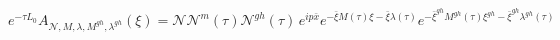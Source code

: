\begin{equation}
e^{-\tau L_{0}}A_{\mathcal{N},M,\lambda ,M^{gh},\lambda ^{gh}}(\xi )=%
\mathcal{N}\mathcal{N}^{m}(\tau )\mathcal{N}^{gh}(\tau )\,e^{ip\bar{x}}e^{-%
\bar{\xi}M(\tau )\xi -\bar{\xi}\lambda (\tau )}e^{-\bar{\xi}^{gh}M^{gh}(\tau
)\xi ^{gh}-\bar{\xi}^{gh}\lambda ^{gh}(\tau )}~~
\end{equation}

